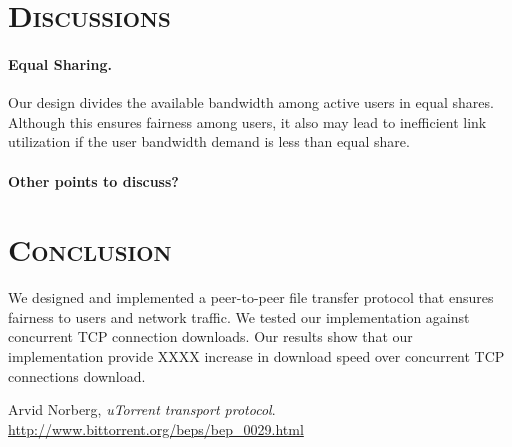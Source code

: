 \section*{\scshape Discussions}
\paragraph{Equal Sharing.} Our design divides the available bandwidth among active users in equal shares. Although this ensures fairness among users, it also may lead to inefficient link utilization if the user bandwidth demand is less than equal share. 

\paragraph{Other points to discuss? }

\section*{\scshape Conclusion}
We designed and implemented a peer-to-peer file transfer protocol that ensures fairness to users and network traffic. We tested our implementation against concurrent TCP connection downloads. Our results show that our implementation provide XXXX increase in download speed over concurrent TCP connections download. 

\begin{thebibliography}{999}

  Arvid Norberg,
  \emph{uTorrent transport protocol}.
  \url{http://www.bittorrent.org/beps/bep_0029.html}

\end{thebibliography}

